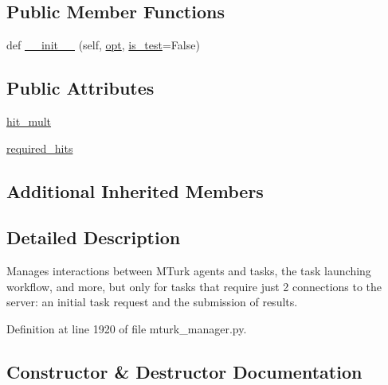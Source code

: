 \subsection*{Public Member Functions}
\begin{DoxyCompactItemize}
\item 
def \hyperlink{classparlai_1_1mturk_1_1core_1_1dev_1_1mturk__manager_1_1StaticMTurkManager_aa99bc029283284f4804cae475b46e9f4}{\+\_\+\+\_\+init\+\_\+\+\_\+} (self, \hyperlink{classparlai_1_1mturk_1_1core_1_1dev_1_1mturk__manager_1_1MTurkManager_a07b188c1af35f83c7052aeabc11209d6}{opt}, \hyperlink{classparlai_1_1mturk_1_1core_1_1dev_1_1mturk__manager_1_1MTurkManager_adee3e80e1a38daf5b96ede29d4866e73}{is\+\_\+test}=False)
\end{DoxyCompactItemize}
\subsection*{Public Attributes}
\begin{DoxyCompactItemize}
\item 
\hyperlink{classparlai_1_1mturk_1_1core_1_1dev_1_1mturk__manager_1_1StaticMTurkManager_a060777f184a4d4d5927e2172cacb0cca}{hit\+\_\+mult}
\item 
\hyperlink{classparlai_1_1mturk_1_1core_1_1dev_1_1mturk__manager_1_1StaticMTurkManager_a3d9217d2766c900a597e36a39f80018d}{required\+\_\+hits}
\end{DoxyCompactItemize}
\subsection*{Additional Inherited Members}


\subsection{Detailed Description}
\begin{DoxyVerb}Manages interactions between MTurk agents and tasks, the task launching workflow,
and more, but only for tasks that require just 2 connections to the server: an
initial task request and the submission of results.
\end{DoxyVerb}
 

Definition at line 1920 of file mturk\+\_\+manager.\+py.



\subsection{Constructor \& Destructor Documentation}
\mbox{\label{classparlai_1_1mturk_1_1core_1_1dev_1_1mturk__manager_1_1StaticMTurkManager_aa99bc029283284f4804cae475b46e9f4}} 
